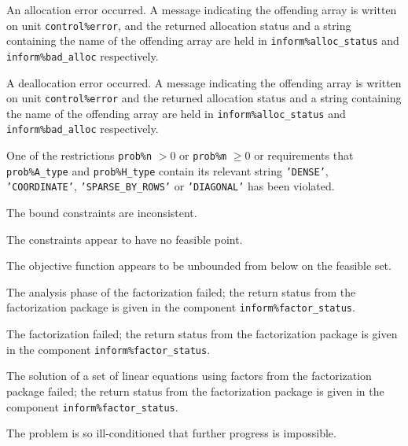 \documentclass{galahad}
\begin{document}
\begin{description}

 An allocation error occurred. 
A message indicating the offending
array is written on unit {\tt control\%error}, and the returned allocation 
status and a string containing the name of the offending array
are held in {\tt inform\%alloc\_\-status}
and {\tt inform\%bad\_alloc} respectively.

 A deallocation error occurred. 
A message indicating the offending 
array is written on unit {\tt control\%error} and the returned allocation 
status and a string containing the name of the offending array
are held in {\tt inform\%alloc\_\-status}
and {\tt inform\%bad\_alloc} respectively.

One of the restrictions {\tt prob\%n} $> 0$ or {\tt prob\%m} $\geq  0$
    or requirements that {\tt prob\%A\_type} 
    and {\tt prob\%H\_type} contain its relevant string
    {\tt 'DENSE'}, {\tt 'COORDINATE'}, {\tt 'SPARSE\_BY\_ROWS'}
    or {\tt 'DIAGONAL'}
    has been violated.


 The bound constraints are inconsistent.

 The constraints appear to have no feasible point.

  The objective function appears to be unbounded 
 from below on the feasible set.

 The analysis phase of the factorization failed; 
 the return status from the factorization
    package is given in the component {\tt inform\%fac\-t\-or\_status}.

 The factorization failed; 
 the return status from the factorization
    package is given in the component {\tt inform\%fac\-t\-or\_status}.

 The solution of a set of linear equations 
 using factors from the factorization package failed; 
 the return status from the factorization
    package is given in the component {\tt inform\%fac\-t\-or\_status}.

 The problem is so ill-conditioned that 
  further progress is impossible.
 

\end{description}
\end{document}
